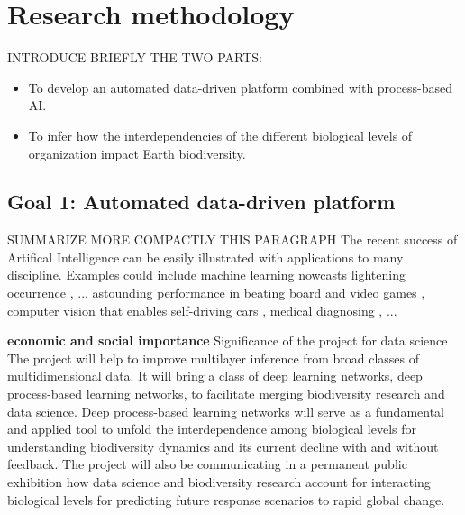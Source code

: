 \documentclass[authoryear,1p,12pt]{elsarticle}
\begin{document}
\section{Research methodology}

INTRODUCE BRIEFLY THE TWO PARTS: 
     \begin{itemize}
     \item To develop an automated data-driven platform combined with
       process-based AI.
     \item To infer how the interdependencies of the different
       biological levels of organization impact Earth biodiversity.
     \end{itemize}

     \subsection{Goal 1: Automated data-driven platform}
     
SUMMARIZE MORE COMPACTLY THIS PARAGRAPH     
     \cite{Webb2018,Heaven2019} The recent success of Artifical
     Intelligence can be easily illustrated with applications to many
     discipline. Examples could include machine learning nowcasts
     lightening occurrence \cite{Mostajabi2019}, ...  astounding
     performance in beating board and video games
     \cite{Mnih2015,Silver2016}, computer vision that enables
     self-driving cars \cite{Poggio2004,Krizhevsky2012}, medical
     diagnosing \cite{Ferrucci2013}, ...

     {\bf economic and social importance} Significance of the project
     for data science The project will help to improve multilayer
     inference from broad classes of multidimensional data. It will
     bring a class of deep learning networks, deep process-based
     learning networks, to facilitate merging biodiversity research
     and data science. Deep process-based learning networks will serve
     as a fundamental and applied tool to unfold the interdependence
     among biological levels for understanding biodiversity dynamics
     and its current decline with and without feedback. The project
     will also be communicating in a permanent public exhibition how
     data science and biodiversity research account for interacting
     biological levels for predicting future response scenarios to
     rapid global change.
\end{document}
